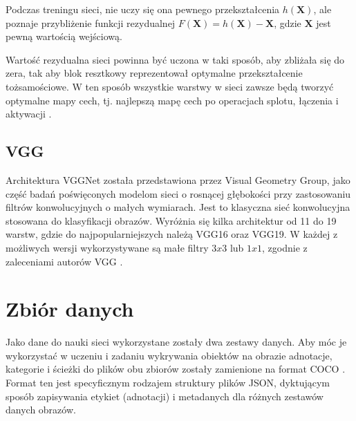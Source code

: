 Podczas treningu sieci, nie uczy się ona pewnego przekształcenia $h(\textbf{X})$, ale poznaje przybliżenie funkcji rezydualnej $F(\textbf{X}) = h(\textbf{X}) - \textbf{X}$, gdzie $\textbf{X}$ jest pewną wartością wejściową. 

Wartość rezydualna sieci powinna być uczona w taki sposób, aby zbliżała się do zera, tak aby blok resztkowy reprezentował optymalne przekształcenie tożsamościowe. W ten sposób wszystkie warstwy w sieci zawsze będą tworzyć optymalne mapy cech, tj. najlepszą mapę cech po operacjach splotu, łączenia i aktywacji \cite{Resnet2}.

\subsection{VGG}

\hspace{0.5cm}
Architektura VGGNet została przedstawiona przez Visual Geometry Group, jako część badań poświęconych modelom sieci o rosnącej głębokości przy zastosowaniu filtrów konwolucyjnych o małych wymiarach. Jest to klasyczna sieć konwolucyjna stosowana do klasyfikacji obrazów. Wyróżnia się kilka architektur od 11 do 19 warstw, gdzie do najpopularniejszych należą VGG16 oraz VGG19. W każdej z możliwych wersji wykorzystywane są małe filtry $3x3$ lub $1x1$, zgodnie z zaleceniami autorów VGG \cite{ResNet}.


\section{Zbiór danych}

\hspace{0.5cm}
Jako dane do nauki sieci wykorzystane zostały dwa zestawy danych. Aby móc je wykorzystać w uczeniu i zadaniu wykrywania obiektów na obrazie adnotacje, kategorie i ścieżki do plików obu zbiorów zostały zamienione na format COCO \cite{CistyscapesToCOCO}. Format ten jest specyficznym rodzajem struktury plików JSON, dyktującym sposób zapisywania etykiet (adnotacji) i metadanych dla różnych zestawów danych obrazów.

